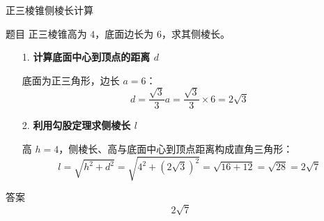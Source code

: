   \begin{frame}{正三棱锥侧棱长计算}
    \begin{block}{题目}
      正三棱锥高为 \(4\)，底面边长为 \(6\)，求其侧棱长。
    \end{block}
  \pause
    \begin{enumerate}
      \item[1.] \textbf{计算底面中心到顶点的距离 \(d\)}  
      
        底面为正三角形，边长 \(a = 6\)：  
        \[
        d = \frac{\sqrt{3}}{3}a = \frac{\sqrt{3}}{3} \times 6 = 2\sqrt{3}
        \]
  
      \item[2.] \textbf{利用勾股定理求侧棱长 \(l\)}  
      
        高 \(h = 4\)，侧棱长、高与底面中心到顶点距离构成直角三角形：  
        \[
        l = \sqrt{h^2 + d^2} = \sqrt{4^2 + (2\sqrt{3})^2} = \sqrt{16 + 12} = \sqrt{28} = 2\sqrt{7}
        \]
    \end{enumerate}
  
    \begin{exampleblock}{答案}
      \[
      \boxed{2\sqrt{7}}
      \]
    \end{exampleblock}
  \end{frame}
  